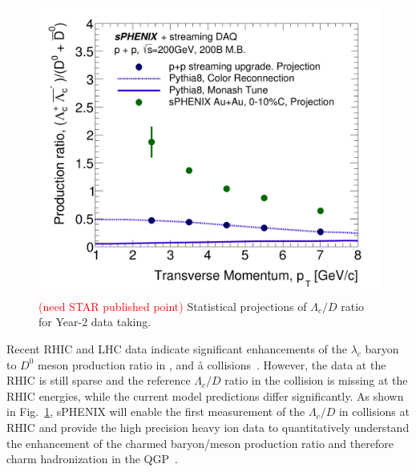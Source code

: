 



\begin{figure}[htbp]
\begin{center}
\includegraphics[width=.49\linewidth]{figs/RAA_DB_theory_root_LcD0Ratio_pp200B.pdf}
\caption{{\textcolor{red}{(need STAR published point)}} Statistical projections of $\Lambda_c/D$ ratio for Year-2 data taking.}
\label{fig:Lc-D0}
\end{center}
\end{figure}


Recent RHIC and LHC data indicate significant enhancements of the
$\lambda_c$ baryon to $D^0$ meson production ratio in \pp, \pA and \aa
collisions~\cite{Adam:2019hpq}. However, the data at the RHIC is still
sparse and the reference $\Lambda_c/D$ ratio in the \pp collision is
missing at the RHIC energies, while the current model predictions
differ significantly. As shown in Fig.~\ref{fig:Lc-D0}, sPHENIX will
enable the first measurement of the $\Lambda_c/D$ in \pp collisions at
RHIC and provide the high precision heavy ion data to quantitatively
understand the enhancement of the charmed baryon/meson production
ratio and therefore charm hadronization in the QGP~\cite{something}.


